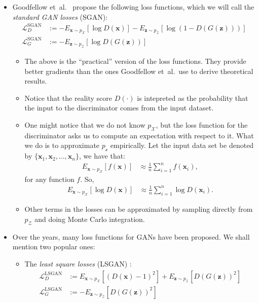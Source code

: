\documentclass[10pt]{article}
\newcommand{\ve}[1]{\pmb{#1}}
\newcommand{\mc}[1]{\mathcal{#1}}
\newcommand{\etal}{{et~al.}}
\begin{document}
\begin{itemize}
  	\item Goodfellow \etal~\cite{Goodfellow:2014} propose the following loss functions, which we will call the \emph{standard GAN losses} (SGAN):
  	\begin{align*}
  		\mathcal{L}_{D}^{\mathrm{SGAN}} &:= - E_{\ve{x} \sim p_{\mathcal{X}}}[\log D(\ve{x})] - E_{\ve{z} \sim p_{\mathcal{Z}}}[\log(1 - D(G(\ve{z})))]\\
  		\mathcal{L}_{G}^{\mathrm{SGAN}} &:= - E_{\ve{z} \sim p_{\mathcal{Z}}}[\log D(G(\ve{z}))]
  	\end{align*}
  	\begin{itemize}
  		\item The above is the ``practical'' version of the loss functions. They provide better gradients than the ones Goodfellow \etal~use to derive theoretical results.

  		\item Notice that the reality score $D(\cdot)$ is intepreted as the probability that the input to the discriminator comes from the input dataset.

  		\item One might notice that we do not know $p_{\mathcal{X}}$, but the loss function for the discriminator asks us to compute an expectation with respect to it. What we do is to approximate $p_{\mc{x}}$ empirically. Let the input data set be denoted by $\{ \ve{x}_1, \ve{x}_2, \dotsc, \ve{x}_n \}$, we have that:
	  	\begin{align*}
	  		E_{\ve{x} \sim p_{\mathcal{X}}}[f(\ve{x})]
	  		&\approx \frac{1}{n} \sum_{i=1}^n f(\ve{x}_i),
	  	\end{align*}
	  	for any function $f$. So,
	  	\begin{align*}
	  		E_{\ve{x} \sim p_{\mathcal{X}}}[\log D(\ve{x})]
	  		&\approx \frac{1}{n} \sum_{i=1}^n \log D(\ve{x}_i).
	  	\end{align*}

	  	\item Other terms in the losses can be approximated by sampling directly from $p_{\mathcal{Z}}$ and doing Monte Carlo integration. 
  	\end{itemize}

  	\item Over the years, many loss functions for GANs have been proposed. We shall mention two popular ones:
  	\begin{itemize}
  		\item The \emph{least square losses} (LSGAN) \cite{Mao:2017}:
  		\begin{align*}
  			\mathcal{L}^{\mathrm{LSGAN}}_D 
  			&:= E_{\ve{x} \sim p_{\mathcal{X}}} [(D(\ve{x}) - 1)^2] + E_{\ve{z} \sim p_{\mathcal{Z}}} [D(G(\ve{z}))^2] \\
  			\mathcal{L}^{\mathrm{LSGAN}}_G 
  			&:= -E_{\ve{z} \sim p_{\mathcal{Z}}} [D(G(\ve{z}))^2]
  		\end{align*}


\end{itemize}
\end{itemize}
\end{document}
